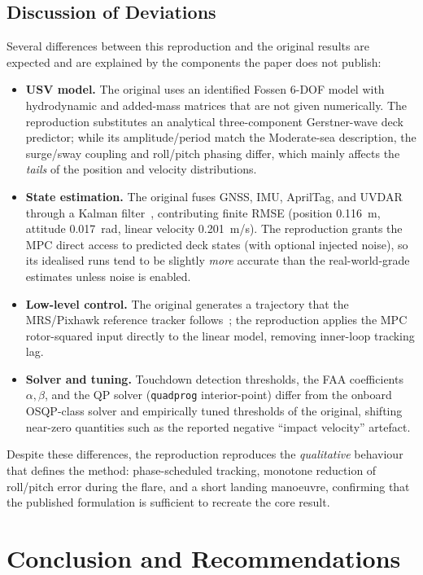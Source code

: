 \documentclass[12pt,a4paper]{report}
\begin{document}
\section{Discussion of Deviations}
Several differences between this reproduction and the original results are expected and are explained by the components the paper does not publish:
\begin{itemize}[itemsep=3pt]
    \item \textbf{USV model.} The original uses an identified Fossen 6-DOF model with hydrodynamic and added-mass matrices that are not given numerically. The reproduction substitutes an analytical three-component Gerstner-wave deck predictor; while its amplitude/period match the Moderate-sea description, the surge/sway coupling and roll/pitch phasing differ, which mainly affects the \emph{tails} of the position and velocity distributions.
    \item \textbf{State estimation.} The original fuses GNSS, IMU, AprilTag, and UVDAR through a Kalman filter~\cite{novak2025,kalman1960}, contributing finite RMSE (position \SI{0.116}{m}, attitude \SI{0.017}{rad}, linear velocity \SI{0.201}{m/s}). The reproduction grants the MPC direct access to predicted deck states (with optional injected noise), so its idealised runs tend to be slightly \emph{more} accurate than the real-world-grade estimates unless noise is enabled.
    \item \textbf{Low-level control.} The original generates a trajectory that the MRS/Pixhawk reference tracker follows~\cite{baca2021}; the reproduction applies the MPC rotor-squared input directly to the linear model, removing inner-loop tracking lag.
    \item \textbf{Solver and tuning.} Touchdown detection thresholds, the FAA coefficients $\alpha,\beta$, and the QP solver (\texttt{quadprog} interior-point) differ from the onboard OSQP-class solver and empirically tuned thresholds of the original, shifting near-zero quantities such as the reported negative ``impact velocity'' artefact.
\end{itemize}
Despite these differences, the reproduction reproduces the \emph{qualitative} behaviour that defines the method: phase-scheduled tracking, monotone reduction of roll/pitch error during the flare, and a short landing manoeuvre, confirming that the published formulation is sufficient to recreate the core result.

\chapter{Conclusion and Recommendations}
\end{document}
